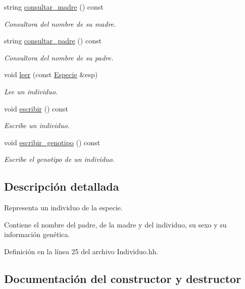 \begin{DoxyCompactItemize}
string \hyperlink{class_individuo_a9de458f5ab162422902d067d717eb5d7}{consultar\+\_\+madre} () const 
\begin{DoxyCompactList}\small\item\em Consultora del nombre de su madre. \end{DoxyCompactList}\item 
string \hyperlink{class_individuo_a255f1cc78dd6c3c079f90b165c8fc1d2}{consultar\+\_\+padre} () const 
\begin{DoxyCompactList}\small\item\em Consultora del nombre de su padre. \end{DoxyCompactList}\item 
void \hyperlink{class_individuo_aca2828dea808d8a09b6bc22719dca574}{leer} (const \hyperlink{class_especie}{Especie} \&esp)
\begin{DoxyCompactList}\small\item\em Lee un individuo. \end{DoxyCompactList}\item 
void \hyperlink{class_individuo_aac432efd9d67a6c3773c226e05d4de02}{escribir} () const 
\begin{DoxyCompactList}\small\item\em Escribe un individuo. \end{DoxyCompactList}\item 
void \hyperlink{class_individuo_adb6531d01a1dfb1613ff87b2a22c1d4b}{escribir\+\_\+genotipo} () const 
\begin{DoxyCompactList}\small\item\em Escribe el genotipo de un individuo. \end{DoxyCompactList}\end{DoxyCompactItemize}


\subsection{Descripción detallada}
Representa un individuo de la especie. 

Contiene el nombre del padre, de la madre y del individuo, su sexo y su información genética. 

Definición en la línea 25 del archivo Individuo.\+hh.



\subsection{Documentación del constructor y destructor}
